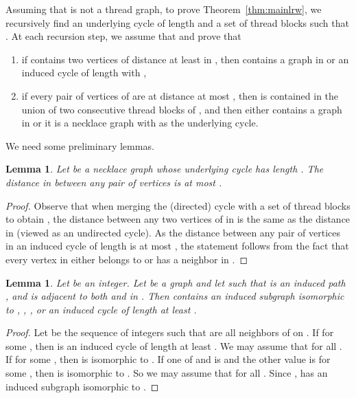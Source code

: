 \documentclass[11pt]{article}
\newtheorem{lemma}[theorem]{Lemma}
\theoremstyle{remark}
\newcommand\house{}
\newcommand\gem{}
\newcommand\domino{}
\begin{document}
Assuming that  is not a  thread graph, to prove Theorem~\ref{thm:mainlrw}, we recursively find an underlying cycle  of length  and a set of thread blocks  such that . At each recursion step, we assume that  and prove that 
\begin{enumerate}[(1)]
\item if  contains two vertices of distance at least  in , 
then  contains a graph in  or an induced cycle of length  with , 
\item if every pair of vertices of  are at distance at most , 
then  is contained in the union of two consecutive thread blocks of , 
and then either  contains a graph in  or it is a necklace graph with  as the underlying cycle.
\end{enumerate} 



We need some preliminary lemmas.

\begin{lemma}\label{lem:excludecycle8}
Let  be a necklace graph whose underlying cycle  has length . The distance in  between any pair of vertices is at most .
\end{lemma}
\begin{proof}
Observe that when merging the (directed) cycle  with a set of thread blocks  to obtain , the distance between any two vertices of  in  is the same as the distance in  (viewed as an undirected cycle). As the distance between any pair of vertices in an induced cycle of length  is at most , the statement follows from the fact that  every vertex in  either belongs to  or has a neighbor in . 
\end{proof}

\begin{lemma}\label{lem:pathtoobs}
Let  be an integer.
Let  be a graph and let  such that  is an induced path , and  is adjacent to both  and  in .
Then  contains an induced subgraph isomorphic to \house, \gem, \domino, or an induced cycle of length at least .
\end{lemma}
\begin{proof}
Let  be the sequence of integers such that  are all neighbors of  on .
If  for some , then  is an induced cycle of length at least .
We may assume that  for all . If  for some , then 
 is isomorphic to \domino. If one of  and  is  and the other value is  for some , then   is isomorphic to \house. So we may assume that  for all .
Since ,  has an induced subgraph isomorphic to \gem.
\end{proof}
\end{document}
